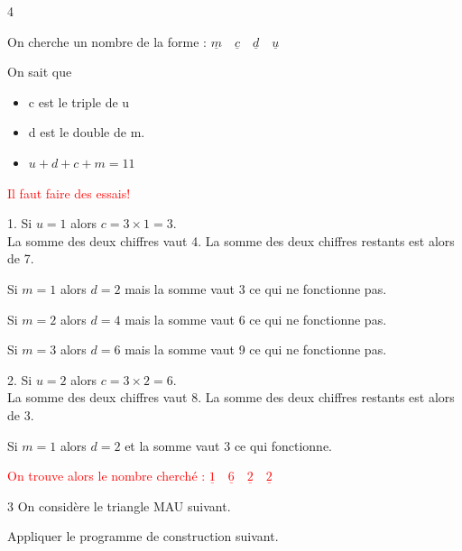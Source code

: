 \documentclass[a4paper]{book}
\begin{document}
{\begin{exerciceNote}{4}
\begin{enumerate}[leftmargin=*]
            On cherche un nombre de la forme : 
            $\underline{m}\quad \underline{c}\quad\underline{d}\quad\underline{u}$

            On sait que 
            \begin{itemize}
                \item c est le triple de u
                \item d est le double de m.
                \item $u+d+c+m=11$
            \end{itemize}

            \textcolor{red}{Il faut faire des essais!}

            \begin{minipage}{0.5\linewidth}
                1. Si $u=1$ alors $c=3\times1=3$.\\
                La somme des deux chiffres vaut 4. La somme des deux chiffres restants est alors de 7.

                Si $m=1$ alors $d=2$ mais la somme vaut 3 ce qui ne fonctionne pas.
                
                Si $m=2$ alors $d=4$ mais la somme vaut 6 ce qui ne fonctionne pas.
                
                Si $m=3$ alors $d=6$ mais la somme vaut 9 ce qui ne fonctionne pas.
            \end{minipage}
            \hfill\vline\hfill
            \begin{minipage}{0.49\linewidth}
                2. Si $u=2$ alors $c=3\times2=6$.\\
                La somme des deux chiffres vaut 8. La somme des deux chiffres restants est alors de 3.

                Si $m=1$ alors $d=2$ et la somme vaut 3 ce qui fonctionne.

                \bigskip

                \textcolor{red}{On trouve alors le nombre cherché : $\underline{1}\quad \underline{6}\quad\underline{2}\quad\underline{2}$}
            \end{minipage}
        \end{enumerate}
    \end{exerciceNote}


    \begin{exerciceNote}{3}
        On considère le triangle MAU suivant.

        Appliquer le programme de construction suivant.


\end{exerciceNote}}
\end{document}
